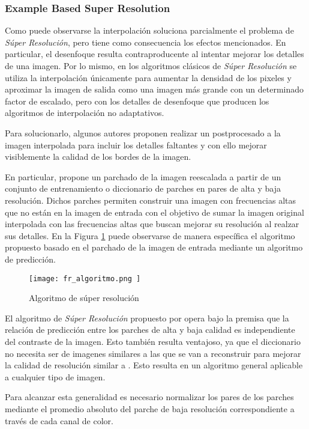 \subsubsection{Example Based Super Resolution}
\noindent
Como puede observarse la interpolación soluciona parcialmente el problema de
\emph{Súper Resolución}, pero tiene como consecuencia los efectos mencionados. En
particular, el desenfoque resulta contraproducente al intentar mejorar los 
detalles de una imagen. Por lo mismo, en los algoritmos clásicos de \emph{Súper Resolución}
se utiliza la interpolación únicamente para aumentar la densidad de los pixeles
y aproximar la imagen de salida como una imagen más grande con un determinado 
factor de escalado, pero con los detalles de desenfoque que producen los 
algoritmos de interpolación no adaptativos. 

Para solucionarlo, algunos autores proponen realizar un postprocesado a la imagen 
interpolada para incluir los detalles faltantes y con ello mejorar visiblemente 
la calidad de los bordes de la imagen. 

En particular, \cite{freeman} propone un parchado de la imagen reescalada a partir
de un conjunto de entrenamiento o diccionario de parches en pares de alta
y baja resolución. Dichos parches permiten construir una imagen con frecuencias
altas que no están en la imagen de entrada con el objetivo de sumar la imagen
original interpolada con las frecuencias altas que buscan mejorar su resolución
al realzar sus detalles. En la Figura \ref{fig:fr_algoritmo} puede observarse de
manera específica el algoritmo propuesto basado en el parchado de la imagen de 
entrada mediante un algoritmo de predicción.

\begin{figure}[H]
    \texttt{[image:  fr\_algoritmo.png ]}
    \centering
    \caption{ Algoritmo de súper resolución }
    \label{fig:fr_algoritmo}
\end{figure}

El algoritmo de \emph{Súper Resolución} propuesto por \cite{freeman}
opera bajo la premisa que la relación
de predicción entre los parches de alta y baja calidad es independiente del 
contraste de la imagen. Esto también resulta ventajoso, ya que el diccionario 
no necesita ser de imagenes similares a las que se van a reconstruir para 
mejorar la calidad de resolución similar a \cite{diccionario_shuji}.
Esto resulta en un algoritmo general aplicable a cualquier tipo de imagen. 

Para alcanzar esta generalidad es necesario normalizar los pares de los parches
mediante el promedio absoluto del parche de baja resolución correspondiente
a través de cada canal de color.